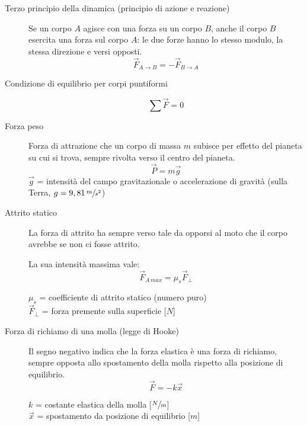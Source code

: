\documentclass[a4paper,11pt,italian]{article}
\begin{document}
\begin{description}
  \item[Terzo principio della dinamica (principio di azione e reazione)] 
  Se un corpo $ A $ agisce con una forza su un corpo $ B $, anche il corpo $ B $ esercita una forza sul corpo $ A $: le due forze hanno lo stesso modulo, la stessa direzione e versi opposti.
  \[ \vec{F}_{A \rightarrow B} = - \vec{F}_{B \rightarrow A}\]
  
  \item[Condizione di equilibrio per corpi puntiformi]
  \[ \sum\vec{F} = 0 \]
  
  \item[Forza peso] 
  Forza di attrazione che un corpo di massa $ m $ subisce per effetto del pianeta su cui si trova, sempre rivolta verso il centro del pianeta.
  \[ \vec{P} = m \vec{g} \]
  $ \vec{g} $ = intensità del campo gravitazionale o accelerazione di gravità (sulla Terra, $ g=9,81 \, \sfrac{m}{s^2} $)
  
  \item[Attrito statico] 
  La forza di attrito ha sempre verso tale da opporsi al moto che il corpo avrebbe se non ci fosse attrito.
  
  La sua intensità massima vale:
  \[ \vec{F}_{A \, max} = \mu_s \vec{F}_\perp  \]
  \begin{multicols}{2}
  $ \mu_s $ = coefficiente di attrito statico (numero puro)\\
  $ \vec{F}_\perp $ = forza premente sulla superficie [$ N $]
  \end{multicols}
  
  \item[Forza di richiamo di una molla (legge di Hooke)]
  Il segno negativo indica che la forza elastica è una forza di richiamo, sempre opposta allo spostamento della molla rispetto alla posizione di equilibrio.
  \[ \vec{F} = - k \vec{x} \]
  \begin{multicols}{2}
  $ k $ = costante elastica della molla [$ \sfrac{N}{m} $]\\
  $ \vec{x} $ = spostamento da posizione di equilibrio [$ m $]
  \end{multicols}
  
%   
\end{description}
\end{document}
